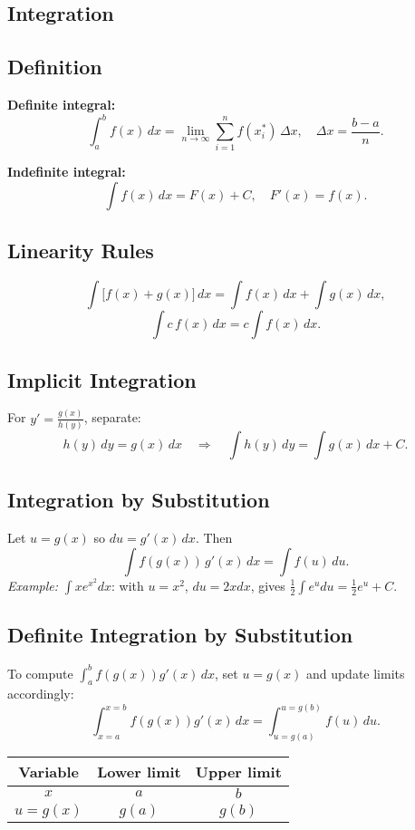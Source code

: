 \documentclass{article}
\begin{document}
\begin{multicols}{2}
\section*{Integration}

\subsection*{Definition}
\textbf{Definite integral:}
\[
\int_a^b f(x)\,dx=\lim_{n\to\infty}\sum_{i=1}^n f(x_i^*)\,\Delta x,
\quad \Delta x=\frac{b-a}{n}.
\]

\textbf{Indefinite integral:}
\[
\int f(x)\,dx=F(x)+C,
\quad F'(x)=f(x).
\]

\subsection*{Linearity Rules}
\[
\int\bigl[f(x)+g(x)\bigr]\,dx=\int f(x)\,dx+\int g(x)\,dx,
\]
\[
\int c\,f(x)\,dx=c\int f(x)\,dx.
\]

\subsection*{Implicit Integration}
For $y'=\frac{g(x)}{h(y)}$, separate:
\[
h(y)\,dy=g(x)\,dx\quad\Longrightarrow\quad
\int h(y)\,dy=\int g(x)\,dx + C.
\]

\subsection*{Integration by Substitution}
Let $u=g(x)$ so $du=g'(x)\,dx$. Then
\[
\int f(g(x))\,g'(x)\,dx=\int f(u)\,du.
\]
\emph{Example:} $\int x e^{x^2}dx$: with $u=x^2$, $du=2x dx$, gives $\tfrac12\int e^u du=\tfrac12 e^u + C$.

\subsection*{Definite Integration by Substitution}
To compute $\int_a^b f(g(x))g'(x)\,dx$, set $u=g(x)$ and update limits accordingly:
\[
\int_{x=a}^{x=b} f(g(x))g'(x)\,dx = \int_{u=g(a)}^{u=g(b)} f(u)\,du.
\]

\begin{center}
\begin{tabular}{c|cc}
Variable & Lower limit & Upper limit \\
\hline
$x$ & $a$ & $b$ \\
$u=g(x)$ & $g(a)$ & $g(b)$
\end{tabular}
\end{center}


\end{multicols}
\end{document}
